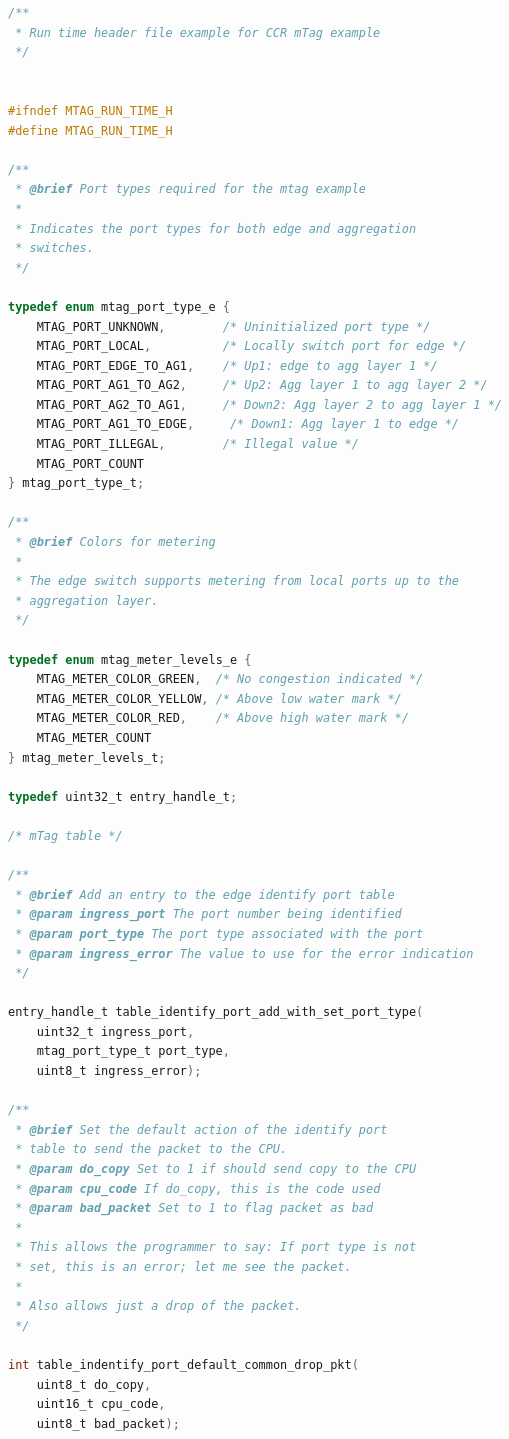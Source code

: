 \documentclass[12pt]{article}
\begin{document}
\begin{lstlisting}[language=C,frame=single]
/**
 * Run time header file example for CCR mTag example
 */


#ifndef MTAG_RUN_TIME_H
#define MTAG_RUN_TIME_H

/**
 * @brief Port types required for the mtag example
 *
 * Indicates the port types for both edge and aggregation
 * switches.
 */

typedef enum mtag_port_type_e {
    MTAG_PORT_UNKNOWN,        /* Uninitialized port type */
    MTAG_PORT_LOCAL,          /* Locally switch port for edge */
    MTAG_PORT_EDGE_TO_AG1,    /* Up1: edge to agg layer 1 */
    MTAG_PORT_AG1_TO_AG2,     /* Up2: Agg layer 1 to agg layer 2 */
    MTAG_PORT_AG2_TO_AG1,     /* Down2: Agg layer 2 to agg layer 1 */
    MTAG_PORT_AG1_TO_EDGE,     /* Down1: Agg layer 1 to edge */
    MTAG_PORT_ILLEGAL,        /* Illegal value */
    MTAG_PORT_COUNT
} mtag_port_type_t;

/**
 * @brief Colors for metering
 *
 * The edge switch supports metering from local ports up to the
 * aggregation layer.
 */

typedef enum mtag_meter_levels_e {
    MTAG_METER_COLOR_GREEN,  /* No congestion indicated */
    MTAG_METER_COLOR_YELLOW, /* Above low water mark */
    MTAG_METER_COLOR_RED,    /* Above high water mark */
    MTAG_METER_COUNT
} mtag_meter_levels_t;

typedef uint32_t entry_handle_t;

/* mTag table */

/**
 * @brief Add an entry to the edge identify port table
 * @param ingress_port The port number being identified
 * @param port_type The port type associated with the port
 * @param ingress_error The value to use for the error indication
 */

entry_handle_t table_identify_port_add_with_set_port_type(
    uint32_t ingress_port, 
    mtag_port_type_t port_type,
    uint8_t ingress_error);

/**
 * @brief Set the default action of the identify port
 * table to send the packet to the CPU.
 * @param do_copy Set to 1 if should send copy to the CPU
 * @param cpu_code If do_copy, this is the code used
 * @param bad_packet Set to 1 to flag packet as bad
 *
 * This allows the programmer to say: If port type is not
 * set, this is an error; let me see the packet.
 *
 * Also allows just a drop of the packet.
 */

int table_indentify_port_default_common_drop_pkt(
    uint8_t do_copy,
    uint16_t cpu_code,
    uint8_t bad_packet);


\end{lstlisting}
\end{document}
